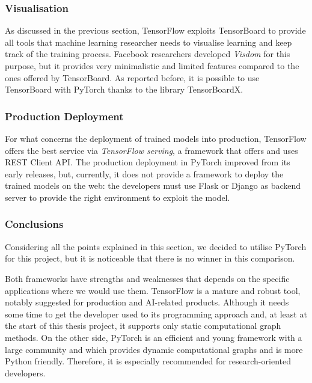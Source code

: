 \subsubsection{Visualisation}

As discussed in the previous section, TensorFlow exploits TensorBoard to provide all tools that machine learning researcher needs to visualise learning and keep track of the training process.
Facebook researchers developed \textit{Visdom} for this purpose, but it provides very minimalistic and limited features compared to the ones offered by TensorBoard.
As reported before, it is possible to use TensorBoard with PyTorch thanks to the library TensorBoardX.

\subsubsection{Production Deployment}

For what concerns the deployment of trained models into production, TensorFlow offers the best service via \textit{TensorFlow serving}, a framework that offers and uses REST Client API.
The production deployment in PyTorch improved from its early releases, but, currently, it does not provide a framework to deploy the trained models on the web: the developers must use Flask or Django as backend server to provide the right environment to exploit the model.

\subsubsection{Conclusions}

Considering all the points explained in this section, we decided to utilise PyTorch for this project, but it is noticeable that there is no winner in this comparison.

Both frameworks have strengths and weaknesses that depends on the specific applications where we would use them.
TensorFlow is a mature and robust tool, notably suggested for production and AI-related products.
Although it needs some time to get the developer used to its programming approach and, at least at the start of this thesis project,  it supports only static computational graph methods.
On the other side, PyTorch is an efficient and young framework with a large community and which provides dynamic computational graphs and is more Python friendly.
Therefore, it is especially recommended for research-oriented developers.